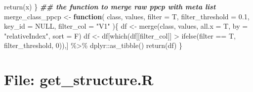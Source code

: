 \documentclass[
]{article}
\newenvironment{Shaded}{\begin{snugshade}}{\end{snugshade}}
\newcommand{\AttributeTok}[1]{\textcolor[rgb]{0.77,0.63,0.00}{#1}}
\newcommand{\ConstantTok}[1]{\textcolor[rgb]{0.00,0.00,0.00}{#1}}
\newcommand{\ControlFlowTok}[1]{\textcolor[rgb]{0.13,0.29,0.53}{\textbf{#1}}}
\newcommand{\DecValTok}[1]{\textcolor[rgb]{0.00,0.00,0.81}{#1}}
\newcommand{\DocumentationTok}[1]{\textcolor[rgb]{0.56,0.35,0.01}{\textbf{\textit{#1}}}}
\newcommand{\FloatTok}[1]{\textcolor[rgb]{0.00,0.00,0.81}{#1}}
\newcommand{\FunctionTok}[1]{\textcolor[rgb]{0.00,0.00,0.00}{#1}}
\newcommand{\NormalTok}[1]{#1}
\newcommand{\OtherTok}[1]{\textcolor[rgb]{0.56,0.35,0.01}{#1}}
\newcommand{\SpecialCharTok}[1]{\textcolor[rgb]{0.00,0.00,0.00}{#1}}
\newcommand{\StringTok}[1]{\textcolor[rgb]{0.31,0.60,0.02}{#1}}
\begin{document}
\begin{Shaded}
\begin{Highlighting}[]
  \FunctionTok{return}\NormalTok{(x)}
\NormalTok{\}}
\DocumentationTok{\#\# the function to merge raw ppcp with meta list}
\NormalTok{merge\_class\_ppcp }\OtherTok{\textless{}{-}}
  \ControlFlowTok{function}\NormalTok{(}
\NormalTok{           class,}
\NormalTok{           values,}
           \AttributeTok{filter =}\NormalTok{ T,}
           \AttributeTok{filter\_threshold =} \FloatTok{0.1}\NormalTok{,}
           \AttributeTok{key\_id =} \ConstantTok{NULL}\NormalTok{,}
           \AttributeTok{filter\_col =} \StringTok{"V1"}
\NormalTok{           )\{}
\NormalTok{    df }\OtherTok{\textless{}{-}} \FunctionTok{merge}\NormalTok{(class, values, }\AttributeTok{all.x =}\NormalTok{ T, }\AttributeTok{by =} \StringTok{"relativeIndex"}\NormalTok{, }\AttributeTok{sort =}\NormalTok{ F)}
\NormalTok{    df }\OtherTok{\textless{}{-}}\NormalTok{ df[}\FunctionTok{which}\NormalTok{(df[[filter\_col]] }\SpecialCharTok{\textgreater{}} \FunctionTok{ifelse}\NormalTok{(filter }\SpecialCharTok{==}\NormalTok{ T, filter\_threshold, }\DecValTok{0}\NormalTok{)),] }\SpecialCharTok{\%\textgreater{}\%}
\NormalTok{      dplyr}\SpecialCharTok{::}\FunctionTok{as\_tibble}\NormalTok{()}
    \FunctionTok{return}\NormalTok{(df)}
\NormalTok{  \}}
\end{Highlighting}
\end{Shaded}

\hypertarget{file-get_structure.r}{%
\section{File: get\_structure.R}\label{file-get_structure.r}}
\end{document}
